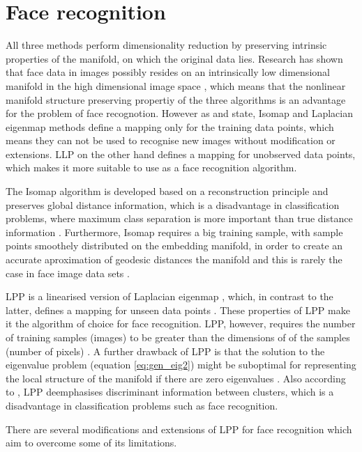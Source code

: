 \documentclass[a4paper, 11pt]{article}
\begin{document}
\section{Face recognition}
All three methods perform dimensionality reduction by preserving intrinsic properties of the manifold, on which the original data lies. Research has shown that face data in images possibly resides on an intrinsically low dimensional manifold in the high dimensional image space \cite{chang2003manifold} \cite{Lee2002} \cite{Roweis2323}, which means that the nonlinear manifold structure preserving propertiy of the three algorithms is an advantage for the problem of face recognotion\cite{He2005}. However as \cite{He2005} and \cite{Xiaofei2005} state, Isomap and Laplacian eigenmap methods define a mapping only for the training data points, which means they can not be used to recognise new images without modification or extensions. LLP on the other hand defines a mapping for unobserved data points, which makes it more suitable to use as a face recognition algorithm. 	

The Isomap algorithm is developed based on a reconstruction principle and preserves global distance information, which is a disadvantage in classification problems, where maximum class separation is more important than true distance information \cite{Yang2002}. Furthermore, Isomap requires a big training sample, with sample points smoothely distributed on the embedding manifold, in order to create an accurate aproximation of geodesic distances the manifold and this is rarely the case in face image data sets \cite{Yang2002}.

LPP is a linearised version of Laplacian eigenmap \cite{Qiao2010}, which, in contrast to the latter, defines a mapping for unseen data points \cite{He2005}\cite{Xiaofei2005}. These properties  of LPP make it the algorithm of choice for face recognition. LPP, however, requires the number of training samples (images) to be greater than the dimensions of of the samples (number of pixels) \cite{Xu2010} \cite{He2005} \cite{Cai2006}. A further drawback of LPP is that the solution to the eigenvalue problem (equation \ref{eq:gen_eig2}) might be suboptimal for representing the local structure of the manifold if there are zero eigenvalues \cite{Xu2010}. Also according to \cite{Yu2006}, LPP deemphasises discriminant information between clusters, which is a disadvantage in classification problems such as face recognition.

There are several modifications and extensions of LPP for face recognition \cite{Xu2010} \cite{Cai2006} \cite{Yu2006} \cite{He2003} \cite{Zheng2007} \cite{Zhi2008} \cite{Cheng2005} which aim to overcome some of its limitations.




\end{document}
